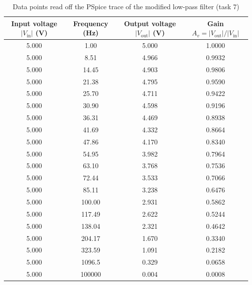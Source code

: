 \documentclass[12pt,a4paper]{article}
\begin{document}
	\begin{table}[H]
		\centering
		\caption{Data points read off the PSpice trace of the modified low-pass filter (task 7)}
		\label{tab:datac}
		\small
		\renewcommand{\arraystretch}{1.2}
		\begin{tabular}{|c|c|c|c|}
			\hline
			\rowcolor{black!12}\textbf{Input voltage $|V_{\mathrm{in}}|$ (V)} & \textbf{Frequency (Hz)} & \textbf{Output voltage $|V_{\mathrm{out}}|$ (V)} & \textbf{Gain $A_v = |V_{\mathrm{out}}|/|V_{\mathrm{in}}|$} \\
			\hline
			\num{5.000} & \num{1.00} & \num{5.000} & \num{1.0000}\\
			\hline
			\num{5.000} & \num{8.51} & \num{4.966} & \num{0.9932}\\
			\hline
			\num{5.000} & \num{14.45} & \num{4.903} & \num{0.9806}\\
			\hline
			\num{5.000} & \num{21.38} & \num{4.795} & \num{0.9590}\\
			\hline
			\num{5.000} & \num{25.70} & \num{4.711} & \num{0.9422}\\
			\hline
			\num{5.000} & \num{30.90} & \num{4.598} & \num{0.9196}\\
			\hline
			\num{5.000} & \num{36.31} & \num{4.469} & \num{0.8938}\\
			\hline
			\num{5.000} & \num{41.69} & \num{4.332} & \num{0.8664}\\
			\hline
			\num{5.000} & \num{47.86} & \num{4.170} & \num{0.8340}\\
			\hline
			\num{5.000} & \num{54.95} & \num{3.982} & \num{0.7964}\\
			\hline
			\num{5.000} & \num{63.10} & \num{3.768} & \num{0.7536}\\
			\hline
			\num{5.000} & \num{72.44} & \num{3.533} & \num{0.7066}\\
			\hline
			\num{5.000} & \num{85.11} & \num{3.238} & \num{0.6476}\\
			\hline
			\num{5.000} & \num{100.00} & \num{2.931} & \num{0.5862}\\
			\hline
			\num{5.000} & \num{117.49} & \num{2.622} & \num{0.5244}\\
			\hline
			\num{5.000} & \num{138.04} & \num{2.321} & \num{0.4642}\\
			\hline
			\num{5.000} & \num{204.17} & \num{1.670} & \num{0.3340}\\
			\hline
			\num{5.000} & \num{323.59} & \num{1.091} & \num{0.2182}\\
			\hline
			\num{5.000} & \num{1096.5} & \num{0.329} & \num{0.0658}\\
			\hline
			\num{5.000} & \num{100000} & \num{0.004} & \num{0.0008} \\
			\hline
		\end{tabular}
	\end{table}
	
\end{document}
